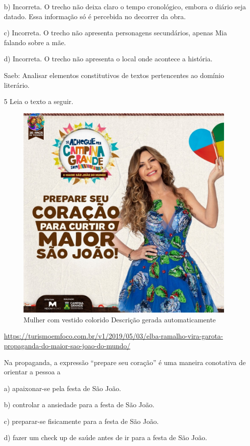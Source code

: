 b) Incorreta. O trecho não deixa claro o tempo cronológico, embora o
diário seja datado. Essa informação só é percebida no decorrer da obra.

c) Incorreta. O trecho não apresenta personagens secundários, apenas Mia
falando sobre a mãe.

d) Incorreta. O trecho não apresenta o local onde acontece a história.

Saeb: Analisar elementos constitutivos de textos pertencentes ao domínio
literário.

\num{5} Leia o texto a seguir.

\begin{figure}
\centering
\includegraphics[width=4.26392in,height=4.23333in]{./imgSAEB_6_POR/media/image40.jpeg}
\caption{Mulher com vestido colorido Descrição gerada automaticamente}
\end{figure}

\url{https://turismoemfoco.com.br/v1/2019/05/03/elba-ramalho-vira-garota-propaganda-do-maior-sao-joao-do-mundo/}

Na propaganda, a expressão ``prepare seu coração'' é uma maneira
conotativa de orientar a pessoa a

a) apaixonar-se pela festa de São João.

b) controlar a ansiedade para a festa de São João.

c) preparar-se fisicamente para a festa de São João.

d) fazer um check up de saúde antes de ir para a festa de São João.

